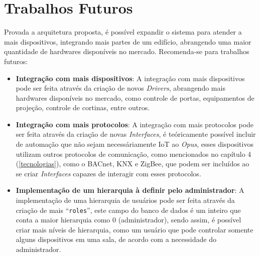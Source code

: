 \chapter{Trabalhos Futuros}
\label{trabalhos_futuros}

Provada a arquitetura proposta, é possível expandir o sistema para atender a mais dispositivos, integrando mais partes de um edifício, abrangendo uma
maior quantidade de hardwares disponíveis no mercado.
Recomenda-se para trabalhos futuros:
\begin{itemize}
    \item \textbf{Integração com mais dispositivos}: A integração com mais dispositivos pode ser feita através da criação de novos \emph{Drivers}, 
    abrangendo mais hardwares disponíveis no mercado, como controle de portas, equipamentos de projeção, controle de cortinas, entre outros.
    \item \textbf{Integração com mais protocolos}: A integração com mais protocolos pode ser feita através da criação de novas \emph{Interfaces},
    é teóricamente possível incluir de automação que não sejam necessáriamente IoT ao \emph{Opus}, esses dispositivos utilizam outros protocolos de comunicação,
    como mencionados no capítulo 4 (\ref{tecnologias}), como o BACnet, KNX e ZigBee, que podem ser incluídos ao se criar \emph{Interfaces} capazes de interagir
    com esses protocolos.
    \item \textbf{Implementação de um hierarquia à definir pelo administrador}: A implementação de uma hierarquia de usuários pode ser feita através da criação
    de mais ``\lstinline{roles}'', este campo do banco de dados é um inteiro que conta a maior hierarquia como 0 (administrador), sendo assim, é possível criar
    mais níveis de hierarquia, como um usuário que pode controlar somente alguns dispositivos em uma sala, de acordo com a necessidade do administrador.
\end{itemize}